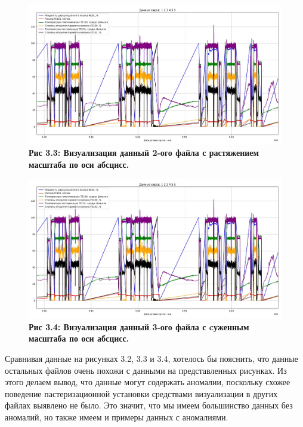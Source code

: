{  \begin{figure}
    \centering
    \def\svgwidth{\textwidth}
    \includegraphics[width=\textwidth]{images/data_1_visual.jpg}
    \caption{\bfseries Рис 3.3: Визуализация данный 2-ого файла с растяжением масштаба по оси абсцисс.}
    \label{fig:NNBlackBox}
  \end{figure}

  \begin{figure}
    \centering
    \def\svgwidth{\textwidth}
    \includegraphics[width=\textwidth]{images/data_1_visual.jpg}
    \caption{\bfseries Рис 3.4: Визуализация данный 3-ого файла с cуженным масштаба по оси абсцисс.}
    \label{fig:NNBlackBox}
  \end{figure}

  \par \redline Сравнивая данные на рисунках 3.2, 3.3 и 3.4, хотелось бы пояснить, что данные остальных файлов очень похожи с данными на представленных рисунках. Из этого делаем вывод, что данные могут содержать аномалии, поскольку схожее поведение пастеризационной установки средствами визуализации в других файлах выявлено не было. Это значит, что мы имеем большинство данных без аномалий, но также имеем и примеры данных с аномалиями. 

}
